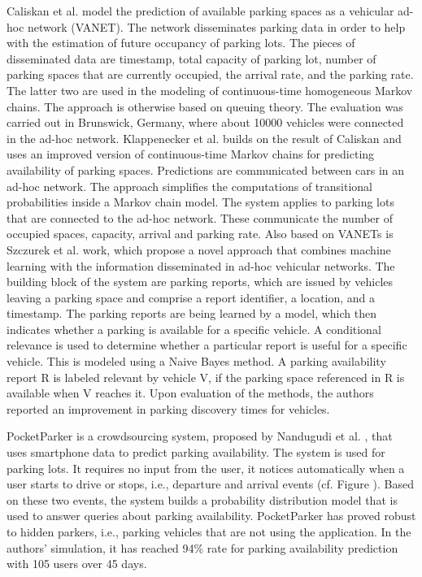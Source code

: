 Caliskan et al. \cite{caliskan} model the prediction of available parking spaces as a vehicular ad-hoc network (VANET). The network disseminates parking data in order to help with the estimation of future occupancy of parking lots. The pieces of disseminated data are timestamp, total capacity of parking lot, number of parking spaces that are currently occupied, the arrival rate, and the parking rate. The latter two are used in the modeling of continuous-time homogeneous Markov chains. The approach is otherwise based on queuing theory. The evaluation was carried out in Brunswick, Germany, where about 10000 vehicles were connected in the ad-hoc network. Klappenecker et al. \cite{klappenecker} builds on the result of Caliskan and uses an improved version of continuous-time Markov chains for predicting availability of parking spaces. Predictions are communicated between cars in an ad-hoc network. The approach simplifies the computations of transitional probabilities inside a Markov chain model. The system applies to parking lots that are connected to the ad-hoc network. These communicate the number of occupied spaces, capacity, arrival and parking rate. Also based on VANETs is Szczurek et al. \cite{szczurek} work, which propose a novel approach that combines machine learning with the information disseminated in ad-hoc vehicular networks. The building block of the system are parking reports, which are issued by vehicles leaving a parking space and comprise a report identifier, a location, and a timestamp. The parking reports are being learned by a model, which then indicates whether a parking is available for a specific vehicle. A conditional relevance is used to determine whether a particular report is useful for a specific vehicle. This is modeled using a Naive Bayes method. A parking availability report R is labeled relevant by vehicle V, if the parking space referenced in R is available when V reaches it. Upon evaluation of the methods, the authors reported an improvement in parking discovery times for vehicles.

PocketParker is a crowdsourcing system, proposed by Nandugudi et al. \cite{nandugudi}, that uses smartphone data to predict parking availability. The system is used for parking lots. It requires no input from the user, it notices automatically when a user starts to drive or stops, i.e., departure and arrival events (cf. Figure ). Based on these two events, the system builds a probability distribution model that is used to answer queries about parking availability. PocketParker has proved robust to hidden parkers, i.e., parking vehicles that are not using the application. In the authors' simulation, it has reached 94\% rate for parking availability prediction with 105 users over 45 days.

